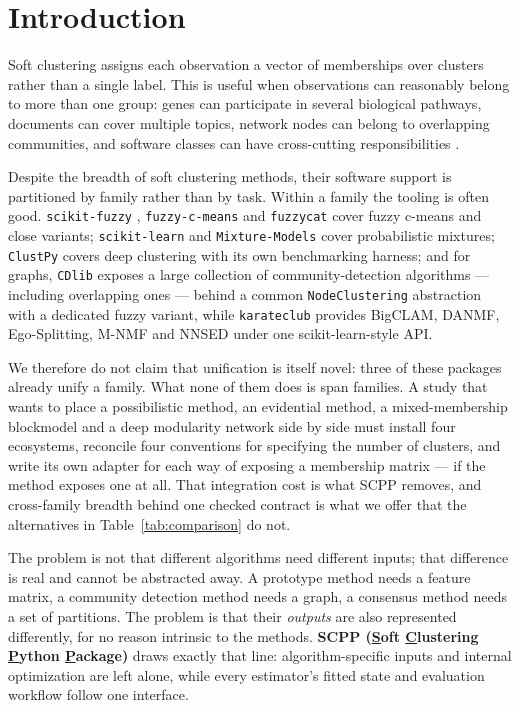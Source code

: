 \documentclass[twoside,11pt]{article}
\begin{document}
\section{Introduction}

Soft clustering assigns each observation a vector of memberships over clusters rather than a single label. This is useful when observations can reasonably belong to more than one group: genes can participate in several biological pathways, documents can cover multiple topics, network nodes can belong to overlapping communities, and software classes can have cross-cutting responsibilities \citep{dogan2025fuzzy,liu2025llm,cangemi2025fuzzy,chi2025novel,ziabakhsh2025extracting,rezaee2025fos}.

Despite the breadth of soft clustering methods, their software support is
partitioned by family rather than by task. Within a family the tooling is
often good. \texttt{scikit-fuzzy} \citep{scikit_fuzzy_2024},
\texttt{fuzzy-c-means} \citep{dias2019fuzzy} and \texttt{fuzzycat}
\citep{oliver_fuzzycat} cover fuzzy c-means and close variants;
\texttt{scikit-learn} \citep{pedregosa2011scikit} and \texttt{Mixture-Models}
\citep{kasa2024mixture} cover probabilistic mixtures; \texttt{ClustPy}
\citep{leiber2023benchmarking} covers deep clustering with its own
benchmarking harness; and for graphs, \texttt{CDlib}
\citep{rossetti2019cdlib} exposes a large collection of community-detection
algorithms --- including overlapping ones --- behind a common
\texttt{NodeClustering} abstraction with a dedicated fuzzy variant, while
\texttt{karateclub} \citep{rozemberczki2020karateclub} provides
BigCLAM, DANMF, Ego-Splitting, M-NMF and NNSED under one scikit-learn-style
API.

We therefore do not claim that unification is itself novel: three of these
packages already unify a family. What none of them does is span families.
A study that wants to place a possibilistic method, an evidential method, a
mixed-membership blockmodel and a deep modularity network side by side must
install four ecosystems, reconcile four conventions for specifying the number
of clusters, and write its own adapter for each way of exposing a membership
matrix --- if the method exposes one at all. That integration cost is what
SCPP removes, and cross-family breadth behind one checked contract is what we
offer that the alternatives in Table~\ref{tab:comparison} do not.

The problem is not that different algorithms need different inputs; that
difference is real and cannot be abstracted away. A prototype method needs a
feature matrix, a community detection method needs a graph, a consensus
method needs a set of partitions. The problem is that their \emph{outputs}
are also represented differently, for no reason intrinsic to the methods.
\textbf{SCPP (\underline{S}oft \underline{C}lustering \underline{P}ython
\underline{P}ackage)} draws exactly that line: algorithm-specific inputs and
internal optimization are left alone, while every estimator's fitted state
and evaluation workflow follow one interface.
\end{document}
